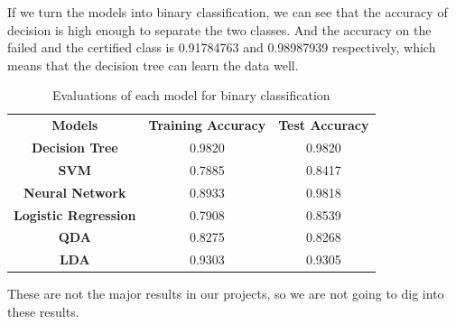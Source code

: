 \documentclass{article}
\begin{document}
If we turn the models into binary classification, we can see that the accuracy of decision is high enough to separate the two classes. And the accuracy on the failed and the certified class is 0.91784763 and 0.98987939 respectively, which means that the decision tree can learn the data well. 
\begin{table}[H]
\centering
\caption{Evaluations of each model for binary classification}
\label{tab: eva2}
\begin{tabular}{|c|c|c|}
\hline
\multirow{2}{*}{\textbf{Models}} & \multirow{2}{*}{\textbf{Training Accuracy}} & \multirow{2}{*}{\textbf{Test Accuracy}} \\
                                 &                                                       &                                                 \\ \hline
\textbf{Decision Tree}           & 0.9820                                                & 0.9820                                          \\ \hline
\textbf{SVM}                     & 0.7885                                                & 0.8417                                          \\ \hline
\textbf{Neural Network}          & 0.8933                                                & 0.9818                                          \\ \hline
\textbf{Logistic Regression}     & 0.7908                                                & 0.8539                                          \\ \hline
\textbf{QDA}                     & 0.8275                                                & 0.8268                                          \\ \hline
\textbf{LDA}                     & 0.9303                                                & 0.9305                                          \\ \hline
\end{tabular}%
\end{table}
These are not the major results in our projects, so we are not going to dig into these results. 
\end{document}
